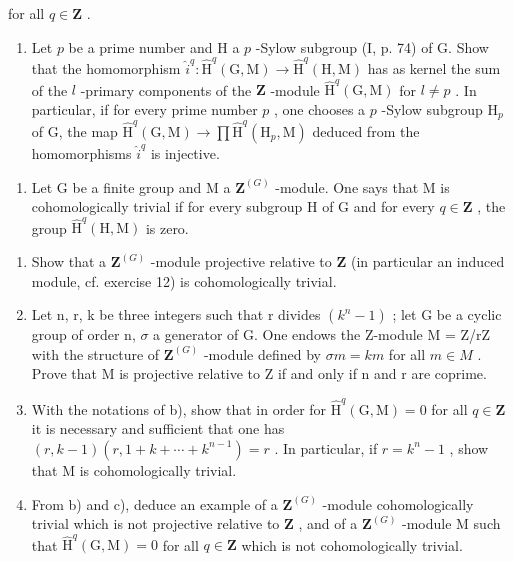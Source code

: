 for all \(q \in \mathbf{Z}\) .

\begin{enumerate}
\def\labelenumi{\alph{enumi})}
\setcounter{enumi}{4}
\tightlist
\item
  Let \(p\) be a prime number and H a \(p\) -Sylow subgroup (I, p. 74) of G. Show that the homomorphism \(\hat{i}^q: \hat{\mathrm{H}}^q(\mathrm{G}, \mathrm{M}) \to \hat{\mathrm{H}}^q(\mathrm{H}, \mathrm{M})\) has as kernel the sum of the \(l\) -primary components of the \(\mathbf{Z}\) -module \(\hat{\mathrm{H}}^q(\mathrm{G}, \mathrm{M})\) for \(l \neq p\) . In particular, if for every prime number \(p\) , one chooses a \(p\) -Sylow subgroup \(\mathrm{H}_p\) of G, the map \(\hat{\mathrm{H}}^q(\mathrm{G}, \mathrm{M}) \to \prod \hat{\mathrm{H}}^q(\mathrm{H}_p, \mathrm{M})\) deduced from the homomorphisms \(\hat{i}^q\) is injective.
\end{enumerate}

\begin{enumerate}
\def\labelenumi{\arabic{enumi})}
\setcounter{enumi}{17}
\tightlist
\item
  Let G be a finite group and M a \(\mathbf{Z}^{(G)}\) -module. One says that M is cohomologically trivial if for every subgroup H of G and for every \(q \in \mathbf{Z}\) , the group \(\hat{\mathrm{H}}^q(\mathrm{H}, \mathrm{M})\) is zero.
\end{enumerate}

\begin{enumerate}
\def\labelenumi{\alph{enumi})}
\item
  Show that a \(\mathbf{Z}^{(G)}\) -module projective relative to \(\mathbf{Z}\) (in particular an induced module, cf. exercise 12) is cohomologically trivial.
\item
  Let n, r, k be three integers such that r divides \((k^{n} - 1)\) ; let G be a cyclic group of order n, \(\sigma\) a generator of G. One endows the Z-module M = Z/rZ with the structure of \(\mathbf{Z}^{(G)}\) -module defined by \(\sigma m = km\) for all \(m \in M\) . Prove that M is projective relative to Z if and only if n and r are coprime.
\item
  With the notations of b), show that in order for \(\hat{\mathrm{H}}^{q}(\mathrm{G}, \mathrm{M}) = 0\) for all \(q \in \mathbf{Z}\) it is necessary and sufficient that one has \((r, k - 1)(r, 1 + k + \cdots + k^{n-1}) = r\) . In particular, if \(r = k^{n} - 1\) , show that M is cohomologically trivial.
\item
  From b) and c), deduce an example of a \(\mathbf{Z}^{(G)}\) -module cohomologically trivial which is not projective relative to \(\mathbf{Z}\) , and of a \(\mathbf{Z}^{(G)}\) -module M such that \(\hat{\mathrm{H}}^q (\mathrm{G},\mathrm{M}) = 0\) for all \(q\in \mathbf{Z}\) which is not cohomologically trivial.
\end{enumerate}

